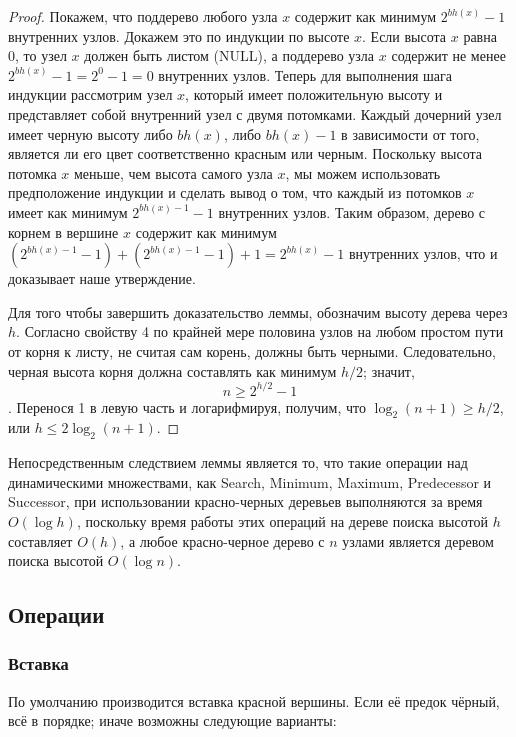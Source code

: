 \begin{proof}
    Покажем, что поддерево любого узла $x$ содержит как минимум $2^{bh(x)} - 1$ внутренних узлов.
    Докажем это по индукции по высоте $x$.
    Если высота $x$ равна 0, то узел $x$ должен быть листом (NULL), а поддерево узла $x$ содержит не менее $2^{bh(x)} - 1 = 2^0 - 1 = 0$ внутренних узлов. 
    Теперь для выполнения шага индукции рассмотрим узел $x$, который имеет положительную высоту и представляет собой внутренний узел с двумя потомками.
    Каждый дочерний узел имеет черную высоту либо $bh(x)$, либо $bh(x) - 1$ в зависимости от того, является ли его цвет соответственно красным или черным.
    Поскольку высота потомка $x$ меньше, чем высота самого узла $x$, мы можем использовать предположение индукции и сделать вывод о том, что каждый из потомков $x$ имеет как минимум $2^{bh(x) - 1} - 1$ внутренних узлов.
    Таким образом, дерево с корнем в вершине $x$ содержит как минимум $(2^{bh(x) - 1} - 1) + (2^{bh(x) - 1} - 1) + 1 = 2^{bh(x)} - 1$ внутренних узлов, что и доказывает наше утверждение.

    Для того чтобы завершить доказательство леммы, обозначим высоту дерева через $h$. Согласно свойству 4 по крайней мере половина узлов на любом простом пути от корня к листу, не считая сам корень, должны быть черными.
    Следовательно, черная высота корня должна составлять как минимум $h/2$; значит, $$n \ge 2^{h/2} - 1$$.
    Перенося 1 в левую часть и логарифмируя, получим, что $\log_2(n + 1) \ge h/2$, или $h \le 2 \log_2(n + 1)$. 
\end{proof}

Непосредственным следствием леммы является то, что такие операции над динамическими множествами, как Search, Minimum, Maximum, Predecessor и Successor, при использовании красно-черных деревьев выполняются за время $O(\log h)$, поскольку время работы этих операций на дереве поиска высотой $h$ составляет $O(h)$, а любое красно-черное дерево с $n$ узлами является деревом поиска высотой $O(\log n)$. 

\subsection{Операции}

\subsubsection{Вставка}

По умолчанию производится вставка красной вершины. Если её предок чёрный, всё в порядке; иначе возможны следующие варианты:

